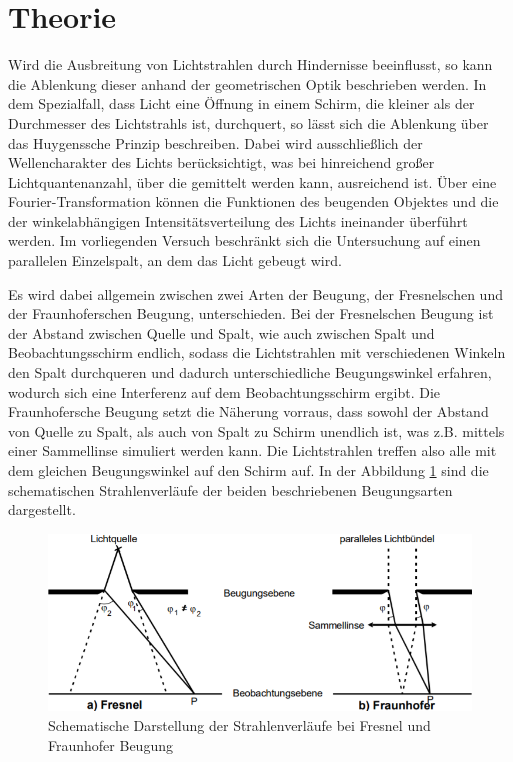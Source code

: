 \section{Theorie}
\label{sec:Theorie}

Wird die Ausbreitung von Lichtstrahlen durch Hindernisse beeinflusst, so kann die Ablenkung dieser anhand der geometrischen 
Optik beschrieben werden. In dem Spezialfall, dass Licht eine Öffnung in einem Schirm, die kleiner als der Durchmesser des 
Lichtstrahls ist, durchquert, so lässt sich die Ablenkung über das Huygenssche Prinzip beschreiben. Dabei wird ausschließlich 
der Wellencharakter des Lichts berücksichtigt, was bei hinreichend großer Lichtquantenanzahl, über die gemittelt werden kann, 
ausreichend ist. Über eine Fourier-Transformation können die Funktionen des beugenden Objektes und die der winkelabhängigen 
Intensitätsverteilung des Lichts ineinander überführt werden. Im vorliegenden Versuch beschränkt sich die Untersuchung
auf einen parallelen Einzelspalt, an dem das Licht gebeugt wird. 

Es wird dabei allgemein zwischen zwei Arten der Beugung, der Fresnelschen und der Fraunhoferschen Beugung, unterschieden.
Bei der Fresnelschen Beugung ist der Abstand zwischen Quelle und Spalt, wie auch zwischen Spalt und Beobachtungsschirm endlich,
sodass die Lichtstrahlen mit verschiedenen Winkeln den Spalt durchqueren und dadurch unterschiedliche Beugungswinkel erfahren, 
wodurch sich eine Interferenz auf dem Beobachtungsschirm ergibt. Die Fraunhofersche Beugung setzt die Näherung vorraus, dass 
sowohl der Abstand von Quelle zu Spalt, als auch von Spalt zu Schirm unendlich ist, was z.B. mittels einer Sammellinse simuliert
werden kann. Die Lichtstrahlen treffen also alle mit dem gleichen Beugungswinkel auf den Schirm auf. In der 
Abbildung \ref{fig:strahlen} sind die schematischen Strahlenverläufe der beiden beschriebenen Beugungsarten dargestellt. 
\begin{figure}
    \centering
    \includegraphics[width=\textwidth]{data/fres_fraun.png}
    \caption{Schematische Darstellung der Strahlenverläufe bei Fresnel und Fraunhofer Beugung}
    \label{fig:strahlen}
\end{figure}

